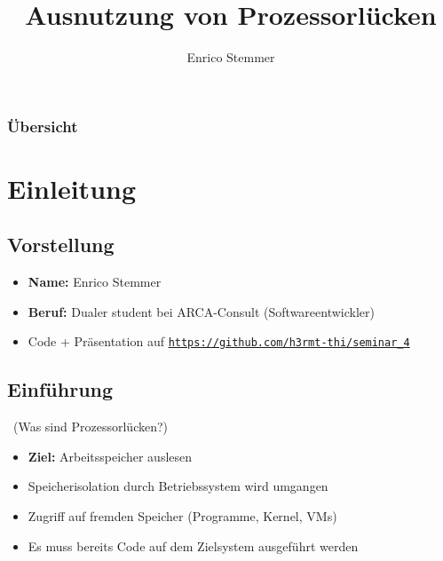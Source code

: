\documentclass[aspectratio=1210]{beamer}
\title{Ausnutzung von Prozessorlücken}
\author{Enrico Stemmer}
\begin{document}
\begin{frame}
	\titlepage
\end{frame}

\begin{frame}
	\frametitle{Übersicht}
	\tableofcontents
\end{frame}

\section{Einleitung}
\subsection{Vorstellung}
\begin{frame}{\insertsubsection}
	\begin{itemize}
		\item \textbf{Name:} Enrico Stemmer
		\item \textbf{Beruf:} Dualer student bei ARCA-Consult (Softwareentwickler)
		      \vspace{0.5cm}
		\item Code + Präsentation auf \href{https://github.com/h3rmt-thi/seminar_4}{\texttt{https://github.com/h3rmt-thi/seminar\_4}}
	\end{itemize}
\end{frame}

\subsection{Einführung}
\begin{frame}{\insertsubsection\ (Was sind Prozessorlücken?)}
	\begin{itemize}
		\item \textbf{Ziel:} Arbeitsspeicher auslesen
		\item Speicherisolation durch Betriebssystem wird umgangen
		\item Zugriff auf fremden Speicher (Programme, Kernel, VMs)
		\item Es muss bereits Code auf dem Zielsystem ausgeführt werden
	\end{itemize}
\end{frame}
\end{document}
